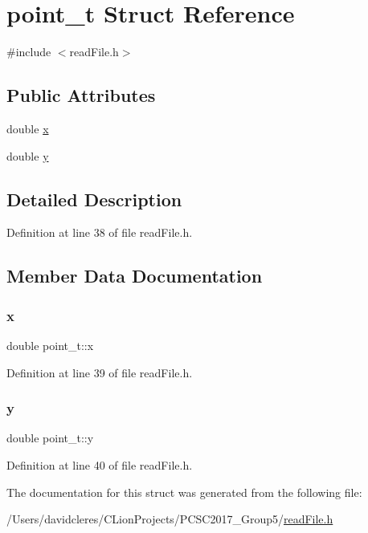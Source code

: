 \hypertarget{structpoint__t}{}\section{point\+\_\+t Struct Reference}
\label{structpoint__t}


{\ttfamily \#include $<$read\+File.\+h$>$}

\subsection*{Public Attributes}
\begin{DoxyCompactItemize}
\item 
double \mbox{\hyperlink{structpoint__t_acf7556ca44360564040f5c86257b55b1}{x}}
\item 
double \mbox{\hyperlink{structpoint__t_a8590af4986d0e4ef2b6756946f80438c}{y}}
\end{DoxyCompactItemize}


\subsection{Detailed Description}


Definition at line 38 of file read\+File.\+h.



\subsection{Member Data Documentation}
\mbox{\label{structpoint__t_acf7556ca44360564040f5c86257b55b1}} 
\subsubsection{\texorpdfstring{x}{x}}
{\footnotesize\ttfamily double point\+\_\+t\+::x}



Definition at line 39 of file read\+File.\+h.

\mbox{\label{structpoint__t_a8590af4986d0e4ef2b6756946f80438c}} 
\subsubsection{\texorpdfstring{y}{y}}
{\footnotesize\ttfamily double point\+\_\+t\+::y}



Definition at line 40 of file read\+File.\+h.



The documentation for this struct was generated from the following file\+:\begin{DoxyCompactItemize}
\item 
/\+Users/davidcleres/\+C\+Lion\+Projects/\+P\+C\+S\+C2017\+\_\+\+Group5/\mbox{\hyperlink{read_file_8h}{read\+File.\+h}}\end{DoxyCompactItemize}
